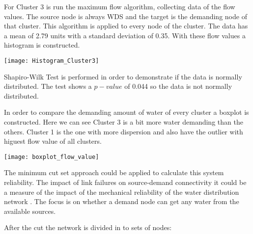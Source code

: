 \documentclass[10pt,a4paper,openany]{article}
\begin{document}
	For Cluster 3 is run the maximum flow algorithm, collecting data of the flow values. The source node is always WDS and the target is the demanding node of that cluster. This algorithm is applied to every node of the cluster. The data has a mean of 2.79 units with a standard deviation of 0.35. With these flow values a histogram is constructed.
	
	\begin{center}
		\texttt{[image: Histogram\_Cluster3]}
	\end{center}
	
	Shapiro-Wilk Test is performed in order to demonstrate if the data is normally distributed. The test shows a $ p-value $ of 0.044 so the data is not normally distributed.
	
	
	
	In order to compare the demanding amount of water of every cluster a boxplot is constructed. Here we can see Cluster 3 is a bit more water demanding than the others. Cluster 1 is the one with more dispersion and also have the outlier with higuest flow value of all clusters.
	
	\begin{center}
		\texttt{[image: boxplot\_flow\_value]}
	\end{center}
			
	The minimum cut set approach could be applied to calculate this system reliability. The impact of link failures on source-demand connectivity it could be a measure of the impact of the mechanical reliability of the water distribution network \citep{yang1996water}. The focus is on whether a demand node can get any water from the available sources.
	
	After the cut the network is divided in to sets of nodes:
	
\end{document}

